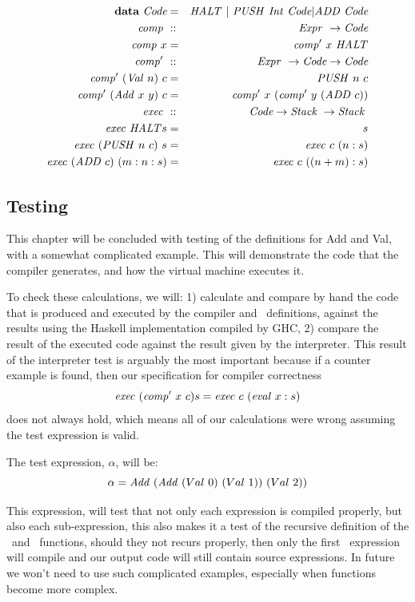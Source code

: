 \documentclass {article}
\begin{document}
\begin{eqnarray}
	\textbf{data}\  \code &=& \HALT\ |\ 
			 \PUSH \Int \code | \ADD \code \nonumber \\
	\Comp &::& \Expr \rightarrow \code \nonumber \\
	\Comp x &=& \Compp  x\ \HALT \label{comp}\\
	\Compp &::& \Expr \rightarrow \code \rightarrow \code \nonumber \\
	\Compp  (\Val n)\ c &=& \PUSH n\ c \label{compval} \\
	\Compp  (\Add x\ y)\ c 
				&=& \Compp  x\ (\Compp  y\ (\ADD c)) \label{compadd}\\
	\Exec &::& \code  \rightarrow \Stack \rightarrow \Stack \nonumber \\
	\Exec \HALT s &=& s \label{exechalt}\\
	\Exec (\PUSH n\ c)\ s &=& \Exec c\ (n:s) \label{execpush}\\
	\Exec (\ADD c)\ (m:n:s) &=& \Exec c\ ((n + m):s) \label{execadd}
\end{eqnarray}

\subsection{Testing}

This chapter will be concluded 
with testing
of the definitions for Add and Val, with a somewhat complicated
example.
This will demonstrate the code that the
compiler generates, and how the virtual machine executes it.

To check these calculations, we will:
1) calculate and compare by hand 
the code that is produced and executed
by the compiler and \vm\ definitions, 
against the results using the Haskell implementation
compiled by GHC,
2) compare the result of the executed code against the result
given by the interpreter. 
This result of the interpreter test is arguably the most
important because if a counter example is found,
then our specification for compiler correctness 
\[ \mathit{exec\ } (\mathit{comp'\ }  x\ c) s = \mathit{exec\ } c\ (\mathit{eval\ }  x : s) \]
does not always hold, 
which means all of our calculations were wrong
assuming the test expression is valid.

The test expression, $\alpha$, will be:
\[ \alpha = \Add (\Add (Val\ 0)\ (Val\ 1))\ (Val\ 2)) \]

This expression, 
will test that not only each expression
is compiled properly, but also each sub-expression,
this also makes it a test of the
recursive definition of the \comp\ and \compp\ functions,
should they not recurs properly, then only the first
\add\ expression will compile and our output code will
still contain source expressions. 
In future we won't need to use such complicated examples, 
especially when functions become more complex.
\end{document}
